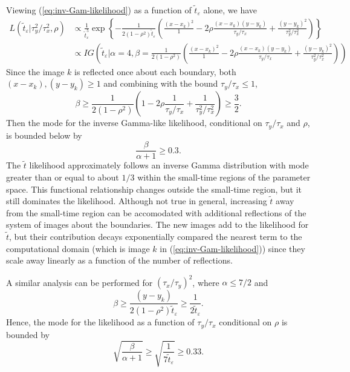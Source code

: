 \documentclass[10pt]{article}
\begin{document}
\begin{enumerate}
    Viewing (\ref{eq:inv-Gam-likelihood}) as a function of
    $\tilde{t}_\varepsilon$ alone, we have
    \begin{align*}
      L(\tilde{t}_\varepsilon | \tau_y^2/\tau_x^2, \rho) &\propto
                                                           \frac{1}{\tilde{t}_\varepsilon^5} \exp\left\{
                                                           -\frac{1}{2(1-\rho^2)\tilde{t}_\varepsilon} \left( \frac{(x -
                                                           x_k)^2}{1} - 2\rho \frac{(x-x_k)(y-y_k)}{\tau_y/\tau_x} +
                                                           \frac{(y - y_k)^2}{\tau_y^2/\tau_x^2} \right) \right\} \\
                                                         &\propto IG\left( \tilde{t}_\varepsilon | \alpha = 4, \beta = \frac{1}{2(1-\rho^2)} \left( \frac{(x -
                                                           x_k)^2}{1} - 2\rho \frac{(x-x_k)(y-y_k)}{\tau_y/\tau_x} +
                                                           \frac{(y - y_k)^2}{\tau_y^2/\tau_x^2} \right)\right)
      \end{align*}
      Since the image $k$ is reflected once about each boundary, both
      $(x-x_k), (y-y_k) \geq 1$ and combining with the bound $\tau_y/\tau_x \leq 1$,
      \[
        \beta \geq \frac{1}{2(1-\rho^2)} \left( 1 - 2\rho
          \frac{1}{\tau_y/\tau_x} + \frac{1}{\tau_y^2/\tau_x^2}
        \right) \geq \frac{3}{2}.
      \]
      Then the mode for the inverse Gamma-like likelihood, conditional on
      $\tau_y/\tau_x$ and $\rho$, is bounded below by
      \[
        \frac{\beta}{\alpha+1} \geq 0.3.
      \]
      The $\tilde{t}$ likelihood approximately follows an inverse
      Gamma distribution with mode greater than or equal to about
      $1/3$ within the small-time regions of the parameter space. This
      functional relationship changes outside the small-time region,
      but it still dominates the likelihood. Although not true in
      general, increasing $\tilde{t}$ away from the small-time region
      can be accomodated with additional reflections of the system of
      images about the boundaries. The new images add to the
      likelihood for $\tilde{t}$, but their contribution decays
      exponentially compared the nearest term to the computational
      domain (which is image $k$ in (\ref{eq:inv-Gam-likelihood})) since they
      scale away linearly as a function of the number of reflections.

      A similar analysis can be performed for $(\tau_x/\tau_y)^2$, where $\alpha \leq 7/2$ and 
      \[
        \beta \geq \frac{(y-y_k)}{2(1-\rho^2)\tilde{t}_\varepsilon} \geq \frac{1}{2\tilde{t}_\varepsilon}.
      \]
      Hence, the mode for the likelihood as a function of
      $\tau_y/\tau_x$ conditional on $\rho$ is bounded by
      \[
        \sqrt{\frac{\beta}{\alpha+1}} \geq \sqrt{\frac{1}{7\tilde{t}_\varepsilon}} \geq 0.33.
      \]


\end{enumerate}
\end{document}
